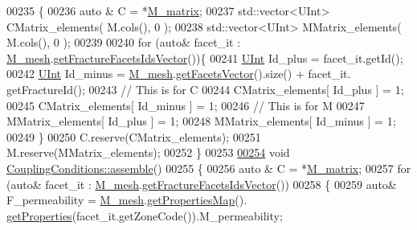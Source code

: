 \begin{DoxyCode}
00235 \{
00236         \textcolor{keyword}{auto} & C = *\hyperlink{classFVCode3D_1_1global__Operator_ab45426efec09f5245e9107794eb7bbd9}{M\_matrix};
00237         std::vector<UInt> CMatrix\_elements( M.cols(), 0 );
00238         std::vector<UInt> MMatrix\_elements( M.cols(), 0 );
00239         
00240         \textcolor{keywordflow}{for} (\textcolor{keyword}{auto}& facet\_it : \hyperlink{classFVCode3D_1_1global__Operator_a027911d0f801f6f19a3006329ec30a7f}{M\_mesh}.\hyperlink{classFVCode3D_1_1Rigid__Mesh_aadbe6d9ad704122537903396d91238e0}{getFractureFacetsIdsVector}())\{
00241                 \hyperlink{namespaceFVCode3D_a4bf7e328c75d0fd504050d040ebe9eda}{UInt} Id\_plus   = facet\_it.getId();
00242                 \hyperlink{namespaceFVCode3D_a4bf7e328c75d0fd504050d040ebe9eda}{UInt} Id\_minus  = \hyperlink{classFVCode3D_1_1global__Operator_a027911d0f801f6f19a3006329ec30a7f}{M\_mesh}.\hyperlink{classFVCode3D_1_1Rigid__Mesh_a6d3cdd4ef8a5225599953179d5302636}{getFacetsVector}().size() + facet\_it.
      getFractureId();
00243                 \textcolor{comment}{// This is for C}
00244                 CMatrix\_elements[ Id\_plus ]   = 1;
00245                 CMatrix\_elements[ Id\_minus ]  = 1;
00246                 \textcolor{comment}{// This is for M}
00247                 MMatrix\_elements[ Id\_plus ]   = 1;
00248                 MMatrix\_elements[ Id\_minus ]  = 1;
00249         \}
00250         C.reserve(CMatrix\_elements);
00251         M.reserve(MMatrix\_elements);
00252 \}
00253 
\hypertarget{global__operator_8cpp_source.tex_l00254}{}\hyperlink{classFVCode3D_1_1CouplingConditions_abc5162d3d50fd44aac557f0a21aa4d3c}{00254} \textcolor{keywordtype}{void} \hyperlink{classFVCode3D_1_1CouplingConditions_abc5162d3d50fd44aac557f0a21aa4d3c}{CouplingConditions::assemble}()
00255 \{
00256         \textcolor{keyword}{auto} & C = *\hyperlink{classFVCode3D_1_1global__Operator_ab45426efec09f5245e9107794eb7bbd9}{M\_matrix};
00257     \textcolor{keywordflow}{for} (\textcolor{keyword}{auto}& facet\_it : \hyperlink{classFVCode3D_1_1global__Operator_a027911d0f801f6f19a3006329ec30a7f}{M\_mesh}.\hyperlink{classFVCode3D_1_1Rigid__Mesh_aadbe6d9ad704122537903396d91238e0}{getFractureFacetsIdsVector}())
00258         \{               
00259         \textcolor{keyword}{auto}& F\_permeability = \hyperlink{classFVCode3D_1_1global__Operator_a027911d0f801f6f19a3006329ec30a7f}{M\_mesh}.\hyperlink{classFVCode3D_1_1Rigid__Mesh_ab6e52fa6193e5db83fe7ccbb1c3737e8}{getPropertiesMap}().
      \hyperlink{classFVCode3D_1_1PropertiesMap_ace888d15c9a4ab13d5e217a3a565604c}{getProperties}(facet\_it.getZoneCode()).M\_permeability;

\end{DoxyCode}
